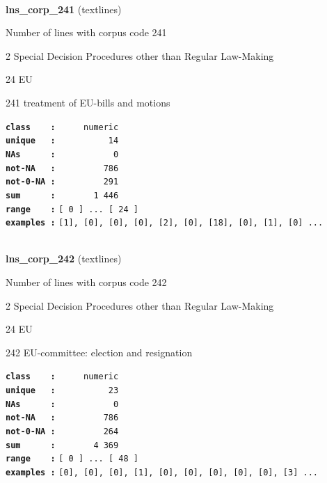 \documentclass[]{article}
\begin{document}
~

\textbf{lns\_corp\_241} (textlines)

Number of lines with corpus code 241

2 Special Decision Procedures other than Regular Law-Making

24 EU

241 treatment of EU-bills and motions

\textbf{\texttt{class\ \ \ \ :}} \texttt{~~~~~numeric}\\
\textbf{\texttt{unique\ \ \ :}} \texttt{~~~~~~~~~~14}\\
\textbf{\texttt{NAs\ \ \ \ \ \ :}} \texttt{~~~~~~~~~~~0}\\
\textbf{\texttt{not-NA\ \ \ :}} \texttt{~~~~~~~~~786}\\
\textbf{\texttt{not-0-NA\ :}} \texttt{~~~~~~~~~291}\\
\textbf{\texttt{sum\ \ \ \ \ \ :}} \texttt{~~~~~~~1~446}\\
\textbf{\texttt{range\ \ \ \ :}}
\texttt{{[}\ 0\ {]}\ ...\ {[}\ 24\ {]}}\\
\textbf{\texttt{examples\ :}}
\texttt{{[}1{]},\ {[}0{]},\ {[}0{]},\ {[}0{]},\ {[}2{]},\ {[}0{]},\ {[}18{]},\ {[}0{]},\ {[}1{]},\ {[}0{]}\ ...}\\

~

\textbf{lns\_corp\_242} (textlines)

Number of lines with corpus code 242

2 Special Decision Procedures other than Regular Law-Making

24 EU

242 EU-committee: election and resignation

\textbf{\texttt{class\ \ \ \ :}} \texttt{~~~~~numeric}\\
\textbf{\texttt{unique\ \ \ :}} \texttt{~~~~~~~~~~23}\\
\textbf{\texttt{NAs\ \ \ \ \ \ :}} \texttt{~~~~~~~~~~~0}\\
\textbf{\texttt{not-NA\ \ \ :}} \texttt{~~~~~~~~~786}\\
\textbf{\texttt{not-0-NA\ :}} \texttt{~~~~~~~~~264}\\
\textbf{\texttt{sum\ \ \ \ \ \ :}} \texttt{~~~~~~~4~369}\\
\textbf{\texttt{range\ \ \ \ :}}
\texttt{{[}\ 0\ {]}\ ...\ {[}\ 48\ {]}}\\
\textbf{\texttt{examples\ :}}
\texttt{{[}0{]},\ {[}0{]},\ {[}0{]},\ {[}1{]},\ {[}0{]},\ {[}0{]},\ {[}0{]},\ {[}0{]},\ {[}0{]},\ {[}3{]}\ ...}\\
\end{document}
